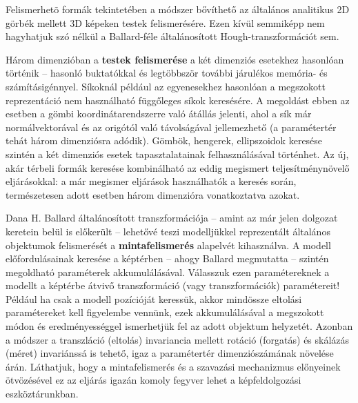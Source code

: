 \bigskip

Felismerhetõ formák tekintetében a módszer bővíthető az általános analitikus 2D görbék mellett 3D képeken testek felismerésére. Ezen kívül semmiképp nem hagyhatjuk szó nélkül a Ballard-féle általánosított Hough-transzformációt sem.

Három dimenzióban a \textbf{testek felismerése} a két dimenziós esetekhez hasonlóan történik -- hasonló buktatókkal és legtöbbször további járulékos memória- és számításigénnyel. Síkoknál például az egyenesekhez hasonlóan a megszokott reprezentáció nem használható függőleges síkok keresésére. A megoldást ebben az esetben a gömbi koordinátarendszerre való átállás jelenti, ahol a sík már normálvektorával és az origótól való távolságával jellemezhető (a paramétertér tehát három dimenziósra adódik). Gömbök, hengerek, ellipszoidok keresése szintén a két dimenziós esetek tapasztalatainak felhasználásával történhet. Az új, akár térbeli formák keresése kombinálható az eddig megismert teljesítménynövelő eljárásokkal: a már megismer eljárások használhatók a keresés során, természetesen adott esetben három dimenzióra vonatkoztatva azokat.

Dana H. Ballard általánosított transzformációja \cite{hough_ballard} -- amint az már jelen dolgozat keretein belül is előkerült -- lehetővé teszi modelljükkel reprezentált általános objektumok felismerését a \textbf{mintafelismerés} alapelvét kihasználva. A modell előfordulásainak keresése a képtérben -- ahogy Ballard megmutatta -- szintén megoldható paraméterek akkumulálásával. Válasszuk ezen paramétereknek a modellt a képtérbe átvivő transzformáció (vagy transzformációk) paramétereit! Például ha csak a modell pozícióját keressük, akkor mindössze eltolási paramétereket kell figyelembe vennünk, ezek akkumulálásával a megszokott módon és eredményességgel ismerhetjük fel az adott objektum helyzetét. Azonban a módszer a transzláció (eltolás) invariancia mellett rotáció (forgatás) és skálázás (méret) invariánssá is tehető, igaz a paramétertér dimenziószámának növelése árán. Láthatjuk, hogy a mintafelismerés és a szavazási mechanizmus előnyeinek ötvözésével ez az eljárás igazán komoly fegyver lehet a képfeldolgozási eszköztárunkban.

